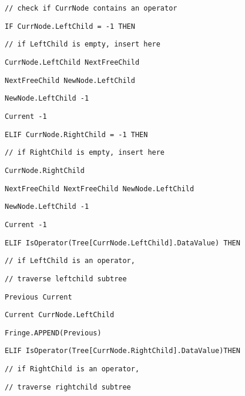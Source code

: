 \begin{minipage}[t]{0.88\columnwidth}
\texttt{\qquad{}\qquad{}\qquad{}// check if CurrNode contains an
operator }

\texttt{\qquad{}\qquad{}\qquad{}\qquad{}IF CurrNode.LeftChild
= -1 THEN }

\texttt{\qquad{}\qquad{}\qquad{}\qquad{}// if LeftChild is empty,
insert here }

\texttt{\qquad{}\qquad{}\qquad{}\qquad{}\qquad{}CurrNode.LeftChild
NextFreeChild }

\texttt{\qquad{}\qquad{}\qquad{}\qquad{}\qquad{}NextFreeChild
NewNode.LeftChild }

\texttt{\qquad{}\qquad{}\qquad{}\qquad{}\qquad{}NewNode.LeftChild
-1 }

\texttt{\qquad{}\qquad{}\qquad{}\qquad{}\qquad{}Current -1}

\texttt{\qquad{}\qquad{}\qquad{}\qquad{}ELIF CurrNode.RightChild
= -1 THEN}

\texttt{\qquad{}\qquad{}\qquad{}\qquad{}\qquad{}// if RightChild
is empty, insert here }

\texttt{\qquad{}\qquad{}\qquad{}\qquad{}\qquad{}CurrNode.RightChild }

\texttt{\qquad{}\qquad{}\qquad{}\qquad{}\qquad{}NextFreeChild
NextFreeChild \textleftarrow{} NewNode.LeftChild }

\texttt{\qquad{}\qquad{}\qquad{}\qquad{}\qquad{}NewNode.LeftChild
-1}

\texttt{\qquad{}\qquad{}\qquad{}\qquad{}\qquad{}Current -1 }

\texttt{\qquad{}\qquad{}\qquad{}\qquad{}ELIF IsOperator(Tree{[}CurrNode.LeftChild{]}.DataValue)
THEN }

\texttt{\qquad{}\qquad{}\qquad{}\qquad{}\qquad{}// if LeftChild
is an operator, }

\texttt{\qquad{}\qquad{}\qquad{}\qquad{}\qquad{}// traverse leftchild
subtree }

\texttt{\qquad{}\qquad{}\qquad{}\qquad{}\qquad{}Previous Current }

\texttt{\qquad{}\qquad{}\qquad{}\qquad{}\qquad{}Current CurrNode.LeftChild}

\texttt{\qquad{}\qquad{}\qquad{}\qquad{}\qquad{}Fringe.APPEND(Previous)}

\texttt{\qquad{}\qquad{}\qquad{}\qquad{}ELIF IsOperator(Tree{[}CurrNode.RightChild{]}.DataValue)THEN }

\texttt{\qquad{}\qquad{}\qquad{}\qquad{}\qquad{}// if RightChild
is an operator, }

\texttt{\qquad{}\qquad{}\qquad{}\qquad{}\qquad{}// traverse rightchild
subtree }


\end{minipage}
